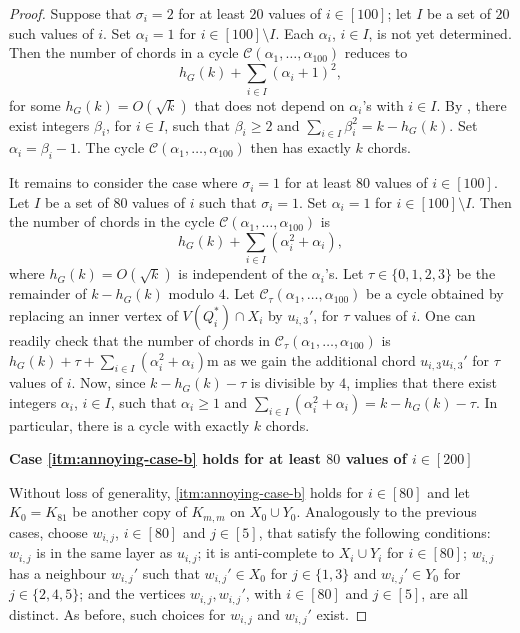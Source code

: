 \documentclass[11pt,english]{article}
\theoremstyle{plain}
\theoremstyle{definition}
\theoremstyle{remark}
\newcommand{\C}{\mathcal{C}}
\begin{document}
\begin{proof}
        Suppose that $\sigma_i = 2$ for at least $20$ values of $i \in [100]$; let $I$ be a set of $20$ such values of $i$. Set $\alpha_i = 1$ for $i \in [100] \setminus I$. Each $\alpha_i$, $i \in I$, is not yet determined. Then the number of chords in a cycle $\C(\alpha_1, \ldots, \alpha_{100})$ reduces to 
        \begin{equation*}
            h_G(k) + \sum_{i \in I} (\alpha_i + 1)^2,
        \end{equation*}
        for some $h_G(k) = O(\sqrt{k})$ that does not depend on $\alpha_i$'s with $i \in I$. By , there exist integers $\beta_i$, for $i \in I$, such that $\beta_i \ge 2$ and $\sum_{i \in I} \beta_i^2 = k - h_G(k)$. Set $\alpha_i = \beta_i - 1$. The cycle $\C(\alpha_1, \ldots, \alpha_{100})$ then has exactly $k$ chords.
        
        It remains to consider the case where $\sigma_i = 1$ for at least $80$ values of $i \in [100]$. Let $I$ be a set of $80$ values of $i$ such that $\sigma_i=1$. Set $\alpha_i = 1$ for $i \in [100] \setminus I$. Then the number of chords in the cycle $\C(\alpha_1, \ldots, \alpha_{100})$ is 
        \begin{equation*} 
             h_G(k) + \sum_{i \in I} (\alpha_i^2 + \alpha_i),
        \end{equation*}
        where $h_G(k) = O(\sqrt{k})$ is independent of the $\alpha_i$'s. Let $\tau \in \{0, 1, 2, 3\}$ be the remainder of $k - h_G(k)$ modulo $4$. Let $\C_{\tau}(\alpha_1, \ldots, \alpha_{100})$ be a cycle obtained by replacing an inner vertex of $V(Q_i^*) \cap X_i$ by $u_{i, 3}'$, for $\tau$ values of $i$. One can readily check that the number of chords in $\C_{\tau}(\alpha_1, \ldots, \alpha_{100})$ is $h_G(k) + \tau + \sum_{i \in I} (\alpha_i^2 + \alpha_i)$m as we gain the additional chord $u_{i, 3} u_{i, 3}'$ for $\tau$ values of $i$. Now, since $k - h_G(k) - \tau$ is divisible by $4$,  implies that there exist integers $\alpha_i$, $i \in I$, such that $\alpha_i \ge 1$ and $\sum_{i \in I} (\alpha_i^2 + \alpha_i) = k - h_G(k) - \tau$. In particular, there is a cycle with exactly $k$ chords.
        
        \medskip
        
        \textbf{Case \ref{itm:annoying-case-b} holds for at least $80$ values of $i \in [200]$}
        
        Without loss of generality, \ref{itm:annoying-case-b} holds for $i \in [80]$ and let $K_0=K_{81}$ be another copy of $K_{m,m}$ on $X_0\cup Y_0$. Analogously to the previous cases, choose $w_{i, j}$, $i \in [80]$ and $j \in [5]$, that satisfy the following conditions: $w_{i, j}$ is in the same layer as $u_{i, j}$; it is anti-complete to $X_i \cup Y_i$ for $i \in [80]$; $w_{i, j}$ has a neighbour $w_{i, j}'$ such that $w_{i, j}' \in X_0$ for $j \in \{1, 3\}$ and $w_{i, j}' \in Y_0$ for $j \in \{2, 4, 5\}$; and the vertices $w_{i, j}, w_{i,j}'$, with $i \in [80]$ and $j \in [5]$, are all distinct. 
        As before, such choices for $w_{i,j}$ and $w_{i,j}'$ exist.
        

\end{proof}
\end{document}
